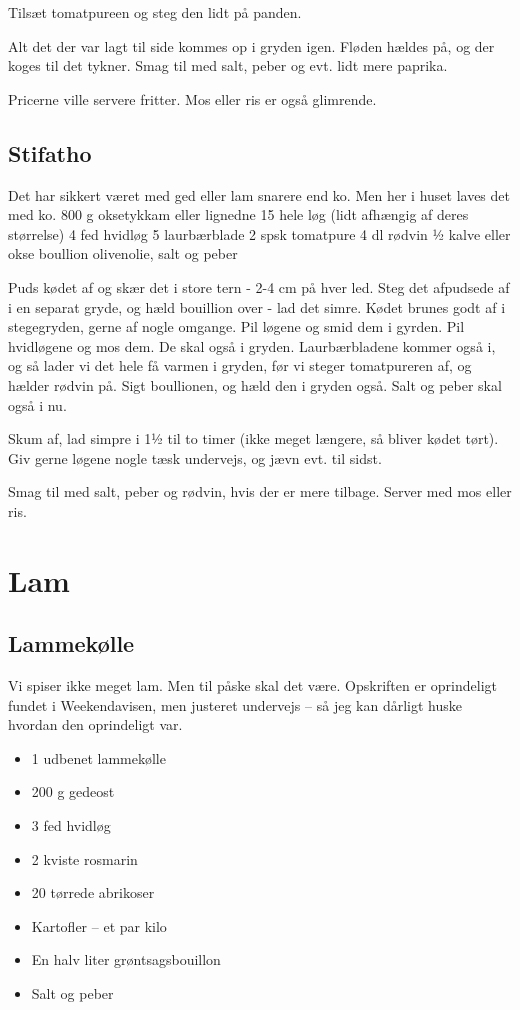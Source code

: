 \documentclass[
]{book}
\providecommand{\tightlist}{%
  \setlength{\itemsep}{0pt}\setlength{\parskip}{0pt}}
\begin{document}
Tilsæt tomatpureen og steg den lidt på panden.

Alt det der var lagt til side kommes op i gryden
igen. Fløden hældes på, og der koges til det
tykner. Smag til med salt, peber og evt. lidt
mere paprika.

Pricerne ville servere fritter. Mos eller ris
er også glimrende.

\hypertarget{stifatho}{%
\section{Stifatho}\label{stifatho}}

Det har sikkert været med ged eller lam snarere end ko. Men her i huset laves det med ko.
800 g oksetykkam eller lignedne
15 hele løg (lidt afhængig af deres størrelse)
4 fed hvidløg
5 laurbærblade
2 spsk tomatpure
4 dl rødvin
½ kalve eller okse boullion
olivenolie, salt og peber

Puds kødet af og skær det i store tern - 2-4 cm på hver led.
Steg det afpudsede af i en separat gryde, og hæld bouillion over - lad det
simre.
Kødet brunes godt af i stegegryden, gerne af nogle omgange.
Pil løgene og smid dem i gyrden.
Pil hvidløgene og mos dem. De skal også i gryden.
Laurbærbladene kommer også i, og så lader vi det hele få varmen i gryden,
før vi steger tomatpureren af, og hælder rødvin på.
Sigt boullionen, og hæld den i gryden også. Salt og peber skal også i nu.

Skum af, lad simpre i 1½ til to timer (ikke meget længere, så bliver kødet
tørt). Giv gerne løgene nogle tæsk undervejs, og jævn evt. til sidst.

Smag til med salt, peber og rødvin, hvis der er mere tilbage. Server med mos eller
ris.

\hypertarget{lam}{%
\chapter{Lam}\label{lam}}

\hypertarget{lammekuxf8lle}{%
\section{Lammekølle}\label{lammekuxf8lle}}

Vi spiser ikke meget lam. Men til påske skal det være. Opskriften er oprindeligt fundet i Weekendavisen, men justeret undervejs -- så jeg kan dårligt huske hvordan den oprindeligt var.

\begin{itemize}
\tightlist
\item
  1 udbenet lammekølle
\item
  200 g gedeost
\item
  3 fed hvidløg
\item
  2 kviste rosmarin
\item
  20 tørrede abrikoser
\item
  Kartofler -- et par kilo
\item
  En halv liter grøntsagsbouillon
\item
  Salt og peber
\end{itemize}
\end{document}
